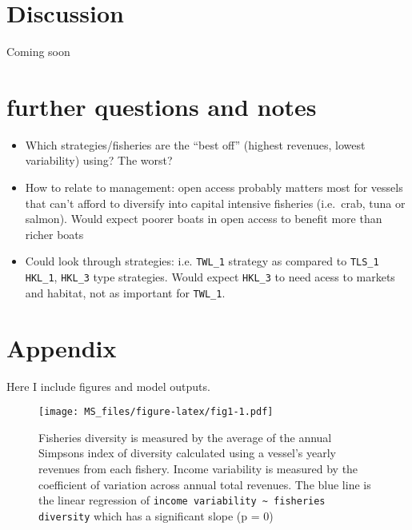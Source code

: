 \documentclass[]{article}
\begin{document}
\section{Discussion}\label{discussion}

Coming soon

\section{further questions and notes}\label{further-questions-and-notes}

\begin{itemize}
\itemsep1pt\parskip0pt
\item
  Which strategies/fisheries are the ``best off'' (highest revenues,
  lowest variability) using? The worst?
\item
  How to relate to management: open access probably matters most for
  vessels that can't afford to diversify into capital intensive
  fisheries (i.e.~crab, tuna or salmon). Would expect poorer boats in
  open access to benefit more than richer boats
\item
  Could look through strategies: i.e. \texttt{TWL\_1} strategy as
  compared to \texttt{TLS\_1} \texttt{HKL\_1}, \texttt{HKL\_3} type
  strategies. Would expect \texttt{HKL\_3} to need acess to markets and
  habitat, not as important for \texttt{TWL\_1}.
\end{itemize}

\section{Appendix}\label{appendix}

Here I include figures and model outputs.

\begin{figure}[htbp]
\centering
\texttt{[image: MS\_files/figure-latex/fig1-1.pdf]}
\caption{Fisheries diversity is measured by the average of the annual
Simpsons index of diversity calculated using a vessel's yearly revenues
from each fishery. Income variability is measured by the coefficient of
variation across annual total revenues. The blue line is the linear
regression of
\texttt{income variability \textasciitilde{} fisheries diversity} which
has a significant slope (p = 0)}
\end{figure}
\end{document}
